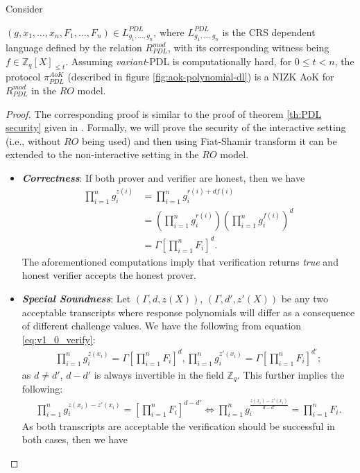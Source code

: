\begin{theorem}\label{th:variant_PDL security}
  Consider\par $(g,x_1,\dots,x_n,F_1,\dots,F_n)\in L_{g_1,\dots,g_n}^{PDL}$, where 
  $L_{g_1,\dots,g_n}^{PDL}$ is the CRS dependent language defined by the relation 
  $R_{PDL}^{mod}$,
  with its corresponding witness being $f\in\mathbb{Z}_q[X]_{\leq t}$.
  Assuming \textit{variant}-PDL is computationally hard, for 
  $0\leq t<n$, the protocol $\pi_{PDL}^{AoK}$ (described in figure \ref{fig:aok-polynomial-dl}) is a 
  NIZK AoK for $R_{PDL}^{mod}$ in the $RO$ model.
\end{theorem}
\begin{proof}
  The corresponding proof is similar to the proof of theorem \ref{th:PDL security} given in \cite{cryptoeprint:2023/1669}. 
  Formally, we will prove the security of the interactive setting (i.e., without $RO$ being used) and then 
  using Fiat-Shamir transform it can be extended to the non-interactive setting in the $RO$ model. 

  \begin{itemize}
    \item \textit{\textbf{Correctness}}: If both prover and verifier are honest, then 
      we have 
      \begin{align}\label{eq:v1_0_verify}
        \prod_{i=1}^{n}g_i^{z(i)}&=\prod_{i=1}^{n}g_i^{r(i)+df(i)}\nonumber\\
        &=(\prod_{i=1}^{n}g_i^{r(i)})(\prod_{i=1}^{n}g_i^{f(i)})^d\nonumber\\
        &=\Gamma [\prod_{i=1}^{n}F_i]^d.
      \end{align}
      The aforementioned computations imply that verification returns \textit{true} and honest verifier accepts the 
      honest prover.
    \item \textit{\textbf{Special Soundness}}: Let $(\Gamma,d,z(X))$, $(\Gamma,d',z'(X))$ 
      be any two acceptable transcripts where response polynomials will differ as a consequence of different challenge 
      values. We have the following from equation \ref{eq:v1_0_verify}:
      \begin{align*}
        \prod_{i=1}^{n}g_i^{z(x_i)}=\Gamma \left[\prod_{i=1}^{n}F_i\right]^d,\prod_{i=1}^{n}g_i^{z'(x_i)}=\Gamma \left[\prod_{i=1}^{n}F_i\right]^{d'};
      \end{align*}
      as $d\neq d'$, $d-d'$ is always invertible in the field $\mathbb{Z}_q$. This further implies
      the following:
      \begin{align}\label{eq:v1_0_Equality}
        \prod_{i=1}^{n}g_i^{z(x_i)-z'(x_i)}=\left[\prod_{i=1}^{n}F_i\right]^{d-d'} \iff \prod_{i=1}^{n}g_i^{\frac{z(x_i)-z'(x_i)}{d-d'}}=\prod_{i=1}^{n}F_i.
      \end{align}
      As both transcripts are acceptable the verification should be successful in both cases, 
      then we have


\end{itemize}
\end{proof}
